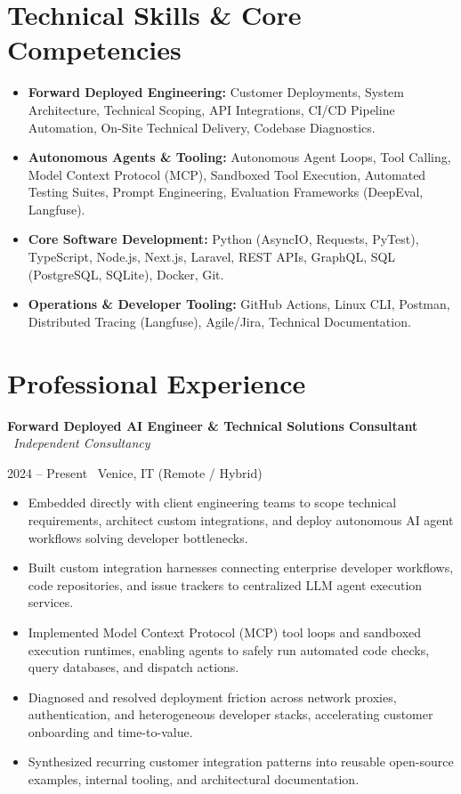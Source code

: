 \documentclass[a4paper,10pt]{article}
\newcommand{\role}[4]{%
  \vspace{2pt}\noindent
  \begin{minipage}[t]{0.70\textwidth}\raggedright\textbf{#1} \textbullet\ \textit{#3}\end{minipage}%
  \hfill
  \begin{minipage}[t]{0.28\textwidth}\raggedleft\footnotesize\color{gray}#2 \textbullet\ #4\end{minipage}%
  \vspace{1pt}%
}
\begin{document}
\section{Technical Skills \& Core Competencies}
\begin{itemize}[leftmargin=1.2em, itemsep=2pt]
  \item \textbf{Forward Deployed Engineering:} Customer Deployments, System Architecture, Technical Scoping, API Integrations, CI/CD Pipeline Automation, On-Site Technical Delivery, Codebase Diagnostics.
  \item \textbf{Autonomous Agents \& Tooling:} Autonomous Agent Loops, Tool Calling, Model Context Protocol (MCP), Sandboxed Tool Execution, Automated Testing Suites, Prompt Engineering, Evaluation Frameworks (DeepEval, Langfuse).
  \item \textbf{Core Software Development:} Python (AsyncIO, Requests, PyTest), TypeScript, Node.js, Next.js, Laravel, REST APIs, GraphQL, SQL (PostgreSQL, SQLite), Docker, Git.
  \item \textbf{Operations \& Developer Tooling:} GitHub Actions, Linux CLI, Postman, Distributed Tracing (Langfuse), Agile/Jira, Technical Documentation.
\end{itemize}

\section{Professional Experience}

\role{Forward Deployed AI Engineer \& Technical Solutions Consultant}{2024 -- Present}{Independent Consultancy}{Venice, IT (Remote / Hybrid)}
\begin{itemize}
  \item Embedded directly with client engineering teams to scope technical requirements, architect custom integrations, and deploy autonomous AI agent workflows solving developer bottlenecks.
  \item Built custom integration harnesses connecting enterprise developer workflows, code repositories, and issue trackers to centralized LLM agent execution services.
  \item Implemented Model Context Protocol (MCP) tool loops and sandboxed execution runtimes, enabling agents to safely run automated code checks, query databases, and dispatch actions.
  \item Diagnosed and resolved deployment friction across network proxies, authentication, and heterogeneous developer stacks, accelerating customer onboarding and time-to-value.
  \item Synthesized recurring customer integration patterns into reusable open-source examples, internal tooling, and architectural documentation.
\end{itemize}
\end{document}
